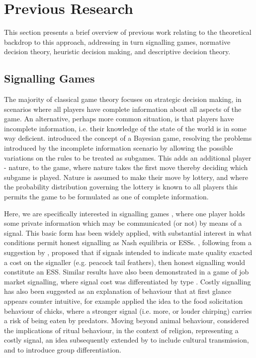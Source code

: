 \section{Previous Research}

\label{sec:lit_review}

This section presents a brief overview of previous work relating to the theoretical backdrop to this approach, addressing in turn signalling games, normative decision theory, heuristic decision making, and descriptive decision theory.


\subsection{Signalling Games}

The majority of classical game theory focuses on strategic decision making, in scenarios where all players have complete information about all aspects of the game. An alternative, perhaps more common situation, is that players have incomplete information, i.e. their knowledge of the state of the world is in some way deficient. \citet{Harsanyi1967} introduced the concept of a Bayesian game, resolving the problems introduced by the incomplete information scenario by allowing the possible variations on the rules to be treated as subgames. This adds an additional player - nature, to the game, where nature takes the first move thereby deciding which subgame is played. Nature is assumed to make their move by lottery, and where the probability distribution governing the lottery is known to all players this permits the game to be formulated as one of complete information. 

Here, we are specifically interested in signalling games \citep{Spence1973,Kreps1987}, where one player holds some private information which may be communicated (or not) by means of a signal.
This basic form has been widely applied, with substantial interest in what conditions permit honest signalling as Nash equilibria or \acp{ESS}. \citet{Grafen1990}, following from a suggestion by \citet{Zahavi1975}, proposed that if signals intended to indicate mate quality exacted a cost on the signaller (e.g. peacock tail feathers), then honest signalling would constitute an \ac{ESS}. Similar results have also been demonstrated in a game of job market signalling, where signal cost was differentiated by type \citep{Spence1973}. 
Costly signalling has also been suggested as an explanation of behaviour that at first glance appears counter intuitive, for example \citet{Godfray1991} applied the idea to the food solicitation behaviour of chicks, where a stronger signal (i.e. more, or louder chirping) carries a risk of being eaten by predators. Moving beyond animal behaviour, \citet{Sosis2003} considered the implications of ritual behaviour, in the context of religion, representing a costly signal, an idea subsequently extended by \citet{Henrich2009} to include cultural transmission, and \citet{Wildman2011} to introduce group differentiation.

